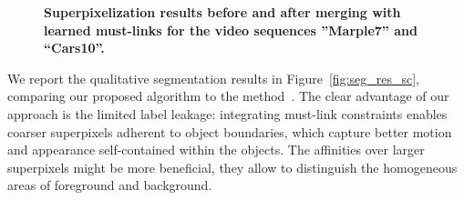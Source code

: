 \begin{figure}[htbp]
\centering
{}
 \caption[Superpixelization results before and after merging with learned must-links for the video sequences ''Marple7'' and ``Cars10'']{
  {\bf Superpixelization results before and after merging with learned must-links for the video sequences ''Marple7'' and ``Cars10''.}}
\label{fig:spx_res}
\end{figure}

We report the qualitative segmentation results in Figure~\ref{fig:seg_res_sc}, comparing our proposed algorithm to the method~\cite{GalassoCS12}.
The clear advantage of our approach is the limited label leakage: integrating must-link constraints enables coarser superpixels adherent to object boundaries, 
which capture better motion and appearance self-contained within the objects. The affinities over larger superpixels might be more beneficial, they allow to distinguish the homogeneous areas of foreground and background.  

